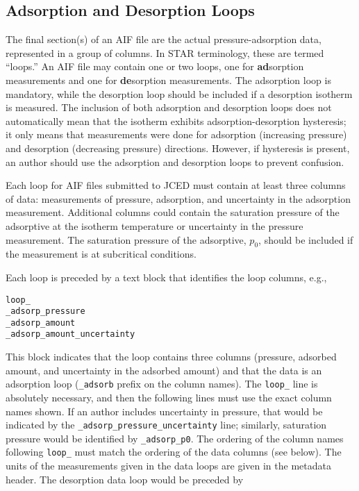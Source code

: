 \documentclass[preprint,pre,showkeys,12pt,superscriptaddress,nofootinbib,endfloats*]{revtex4-1}
\begin{document}
\subsection{Adsorption and Desorption Loops}\label{ssec:loops}

The final section(s) of an AIF file are the actual pressure-adsorption data, represented in a group of columns. In STAR terminology, these are termed ``loops.'' An AIF file may contain one or two loops, one for {\bf ad}sorption measurements and one for {\bf de}sorption measurements. The adsorption loop is mandatory, while the desorption loop should be included if a desorption isotherm is measured. The inclusion of both adsorption and desorption loops does not automatically mean that the isotherm exhibits adsorption-desorption hysteresis; it only means that measurements were done for adsorption (increasing pressure) and desorption (decreasing pressure) directions. However, if hysteresis is present, an author should use the adsorption and desorption loops to prevent confusion.

Each loop for AIF files submitted to JCED must contain at least three columns of data: measurements of pressure, adsorption, and uncertainty in the adsorption measurement. Additional columns could contain the saturation pressure of the adsorptive at the isotherm temperature or uncertainty in the pressure measurement. The saturation pressure of the adsorptive, $p_0$, should be included if the measurement is at subcritical conditions.

Each loop is preceded by a text block that identifies the loop columns, e.g.,

\begin{verbatim}
loop_
_adsorp_pressure
_adsorp_amount
_adsorp_amount_uncertainty
\end{verbatim}

\noindent This block indicates that the loop contains three columns (pressure, adsorbed amount, and uncertainty in the adsorbed amount) and that the data is an adsorption loop (\verb!_adsorb! prefix on the column names). The \verb!loop_! line is absolutely necessary, and then the following lines must use the exact column names shown. If an author includes uncertainty in pressure, that would be indicated by the \verb!_adsorp_pressure_uncertainty! line; similarly, saturation pressure would be identified by \verb!_adsorp_p0!. The ordering of the column names following \verb!loop_! must match the ordering of the data columns (see below). The units of the measurements given in the data loops are given in the metadata header. The desorption data loop would be preceded by
\end{document}
